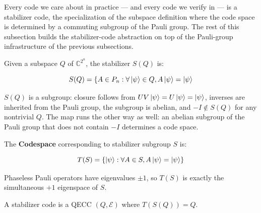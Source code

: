 Every code we care about in practice --- and every code we verify in
 --- is a stabilizer code, the specialization of the
subspace definition where the code space is determined by a commuting subgroup
of the Pauli group. The rest of this subsection builds the stabilizer-code
abstraction on top of the Pauli-group infrastructure of the previous
subsections.

\begin{definition}
    Given a subspace $Q$ of $\mathbb{C}^{2^n}$, the stabilizer $S(Q)$ is:

    $$S(Q) = \{A \in P_n : \forall \ket{\psi} \in Q, A\ket{\psi}=\ket{\psi}$$
\end{definition}

%
%

$S(Q)$ is a subgroup: closure follows from $UV\ket{\psi} = U\ket{\psi} =
\ket{\psi}$, inverses are inherited from the Pauli group, the subgroup is
abelian, and $-I \notin S(Q)$ for any nontrivial $Q$. The map runs the other way
as well: an abelian subgroup of the Pauli group that does not contain $-I$
determines a code space.

\begin{definition}
    The \textbf{Codespace} corresponding to stabilizer subgroup $S$ is:

    $$T(S)=\{\ket{\psi}: \forall A \in S, A\ket{\psi}=\ket{\psi}\}$$
\end{definition}

%

Phaseless Pauli operators have eigenvalues $\pm 1$, so $T(S)$ is exactly the
simultaneous $+1$ eigenspace of $S$.

\begin{definition}
    A stabilizer code is a QECC $(Q, \mathcal{E})$ where $T(S(Q))=Q$.
\end{definition}

